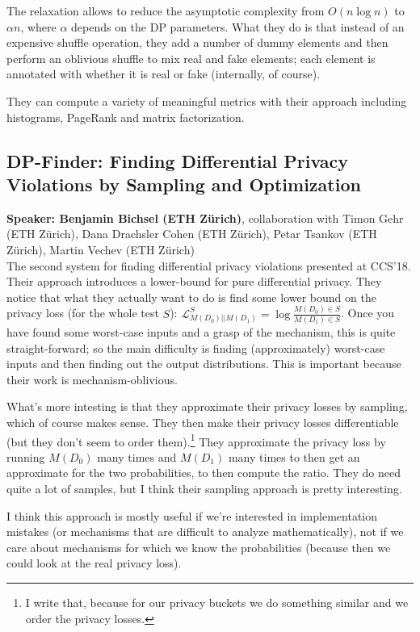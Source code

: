 \documentclass{article}
\begin{document}
The relaxation allows to reduce the asymptotic complexity from $O(n\log n)$ to $\alpha n$, where $\alpha$ depends on the DP parameters.  What they do is that instead of an expensive shuffle operation, they add a number of dummy elements and then perform an oblivious shuffle to mix real and fake elements; each element is annotated with whether it is real or fake (internally, of course).

They can compute a variety of meaningful metrics with their approach including histograms, PageRank and matrix factorization.

\subsection{DP-Finder: Finding Differential Privacy Violations by Sampling and Optimization}
\noindent\textbf{Speaker: Benjamin Bichsel (ETH Zürich)}, collaboration with Timon Gehr (ETH Zürich), Dana Drachsler Cohen (ETH Zürich), Petar Tsankov (ETH Zürich), Martin Vechev (ETH Zürich)\\

The second system for finding differential privacy violations presented at CCS'18. Their approach introduces a lower-bound for pure differential privacy. They notice that what they actually want to do is find some lower bound on the privacy loss (for the whole test $S$): $\mathcal L^S_{M(D_0)||M(D_1)} = \log\frac{M(D_0) \in S}{M(D_1) \in S}$. Once you have found some worst-case inputs and a grasp of the mechanism, this is quite straight-forward; so the main difficulty is finding (approximately) worst-case inputs and then finding out the output distributions. This is important because their work is mechanism-oblivious.

What's more intesting is that they approximate their privacy losses by sampling, which of course makes sense. They then make their privacy losses differentiable (but they don't seem to order them).\footnote{I write that, because for our privacy buckets we do something similar and we order the privacy losses.} They approximate the privacy loss by running $M(D_0)$ many times and $M(D_1)$ many times to then get an approximate for the two probabilities, to then compute the ratio. They do need quite a lot of samples, but I think their sampling approach is pretty interesting.

I think this approach is mostly useful if we're interested in implementation mistakes (or mechanisms that are difficult to analyze mathematically), not if we care about mechanisms for which we know the probabilities (because then we could look at the real privacy loss).
\end{document}
